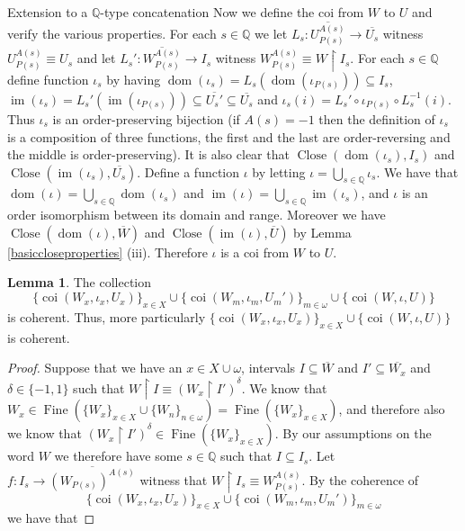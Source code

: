 \documentclass{amsart}
\theoremstyle{definition}\newtheorem{theorem}{Theorem}
\theoremstyle{definition}\newtheorem*{A}{Main Theorem}
\theoremstyle{definition}\newtheorem*{B}{Theorem \ref{elementaryequiv}}
\theoremstyle{definition}\newtheorem*{C}{Theorem \ref{continuous}}
\theoremstyle{definition}\newtheorem*{D}{Theorem \ref{bigisomorphism2}}
\theoremstyle{definition}\newtheorem{bigtheorem}{Main Theorem}
\numberwithin{theorem}{section}
\theoremstyle{definition}\newtheorem{corollary}[theorem]{Corollary}
\theoremstyle{definition}\newtheorem{proposition}[theorem]{Proposition}
\theoremstyle{definition}\newtheorem{definition}[theorem]{Definition}
\theoremstyle{definition}\newtheorem{question}[theorem]{Question}
\theoremstyle{definition}\newtheorem{example}[theorem]{Example}
\theoremstyle{definition}\newtheorem{remark}[theorem]{Remark}
\theoremstyle{definition}\newtheorem{note}[theorem]{Note}
\theoremstyle{definition}\newtheorem{lemma}[theorem]{Lemma}
\theoremstyle{definition}\newtheorem{fact}[theorem]{Fact}
\theoremstyle{definition}\newtheorem{define}[theorem]{Definition}
\theoremstyle{definition}\newtheorem{claim}[theorem]{Claim}
\theoremstyle{definition}\newtheorem{obs}[theorem]{Observation}
\theoremstyle{definition}\newtheorem{definitions}[theorem]{Definitions}
\newcommand{\im}{\operatorname{im}}
\newcommand{\Fine}{\operatorname{Fine}}
\newcommand{\Close}{\operatorname{Close}}
\newcommand{\coi}{\operatorname{coi}}
\newcommand{\dom}{\operatorname{dom}}
\begin{document}
\begin{section}{Extension to a $\mathbb{Q}$-type concatenation}
Now we define the coi from $W$ to $U$ and verify the various properties.  For each $s \in \mathbb{Q}$ we let $L_s: \overline{U_{P(s)}^{A(s)}} \rightarrow \overline{U_s}$ witness $U_{P(s)}^{A(s)} \equiv U_s$ and let $L_s': \overline{W_{P(s)}^{A(s)}}\rightarrow I_s$ witness $W_{P(s)}^{A(s)} \equiv W \upharpoonright I_s$.  For each $s \in \mathbb{Q}$ define function $\iota_s$ by having $\dom(\iota_s) = L_s(\dom(\iota_{P(s)})) \subseteq I_s$, $\im(\iota_s) = L_s'(\im(\iota_{P(s)})) \subseteq \overline{U_s'} \subseteq \overline{U_s}$ and $\iota_s(i) = L_s' \circ \iota_{P(s)}\circ L_s^{-1}(i)$.  Thus $\iota_s$ is an order-preserving bijection (if $A(s) = -1$ then the definition of $\iota_s$ is a composition of three functions, the first and the last are order-reversing and the middle is order-preserving).  It is also clear that $\Close(\dom(\iota_s),  I_s)$ and $\Close(\im(\iota_s), \overline{U_s})$.  Define a function $\iota$ by letting $\iota = \bigcup_{s \in \mathbb{Q}} \iota_s$.  We have that $\dom(\iota) = \bigcup_{s \in \mathbb{Q}} \dom(\iota_s)$ and $\im(\iota) = \bigcup_{s \in \mathbb{Q}}\im(\iota_s)$, and $\iota$ is an order isomorphism between its domain and range.  Moreover we have $\Close(\dom(\iota), \overline{W})$ and $\Close(\im(\iota), \overline{U})$ by Lemma \ref{basiccloseproperties} (iii).  Therefore $\iota$ is a coi from $W$ to $U$.

\begin{lemma}\label{itworksforQ}  The collection $$\{\coi(W_x, \iota_x, U_x)\}_{x \in X} \cup \{\coi(W_m, \iota_m, U_m')\}_{m \in \omega} \cup \{\coi(W, \iota, U)\}$$ is coherent.  Thus, more particularly $\{\coi(W_x, \iota_x, U_x)\}_{x \in X} \cup \{\coi(W, \iota, U)\}$ is coherent.
\end{lemma}

\begin{proof}  Suppose that we have an $x \in X \cup \omega$, intervals $I \subseteq \overline{W}$ and $I' \subseteq \overline{W_x}$ and $\delta \in \{-1, 1\}$ such that $W \upharpoonright I \equiv (W_x \upharpoonright I')^{\delta}$.  We know that $W_x \in \Fine(\{W_x\}_{x \in X} \cup \{W_n\}_{n \in \omega}) = \Fine(\{W_x\}_{x \in X})$, and therefore also we know that $(W_x \upharpoonright I')^{\delta} \in \Fine(\{W_x\}_{x \in X})$.  By our assumptions on the word $W$ we therefore have some $s \in \mathbb{Q}$ such that $I \subseteq I_s$.  Let $f: I_s \rightarrow \overline{(W_{P(s)})^{A(s)}}$ witness that $W \upharpoonright I_s \equiv W_{P(s)}^{A(s)}$.  By the coherence of $$\{\coi(W_x, \iota_x, U_x)\}_{x \in X} \cup \{\coi(W_m, \iota_m, U_m')\}_{m \in \omega}$$ we have that




\end{proof}
\end{section}
\end{document}
